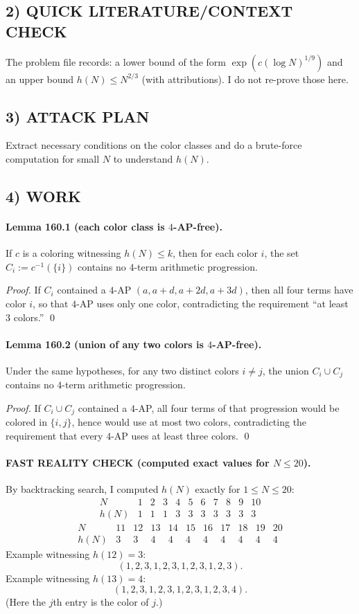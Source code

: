 \subsection*{2) QUICK LITERATURE/CONTEXT CHECK}
The problem file records: a lower bound of the form $\exp(c(\log N)^{1/9})$ and an upper bound $h(N)\le N^{2/3}$ (with attributions). I do not re-prove those here.

\subsection*{3) ATTACK PLAN}
Extract necessary conditions on the color classes and do a brute-force computation for small $N$ to understand $h(N)$.

\subsection*{4) WORK}
\paragraph{Lemma 160.1 (each color class is $4$-AP-free).}
If $c$ is a coloring witnessing $h(N)\le k$, then for each color $i$, the set $C_i:=c^{-1}(\{i\})$ contains no $4$-term arithmetic progression.

\textit{Proof.}
If $C_i$ contained a $4$-AP $(a,a+d,a+2d,a+3d)$, then all four terms have color $i$, so that $4$-AP uses only one color, contradicting the requirement ``at least $3$ colors.'' \qed

\paragraph{Lemma 160.2 (union of any two colors is $4$-AP-free).}
Under the same hypotheses, for any two distinct colors $i\ne j$, the union $C_i\cup C_j$ contains no $4$-term arithmetic progression.

\textit{Proof.}
If $C_i\cup C_j$ contained a $4$-AP, all four terms of that progression would be colored in $\{i,j\}$, hence would use at most two colors, contradicting the requirement that every $4$-AP uses at least three colors. \qed

\paragraph{FAST REALITY CHECK (computed exact values for $N\le 20$).}
By backtracking search, I computed $h(N)$ exactly for $1\le N\le 20$:
\[
\begin{array}{c|cccccccccc}
N&1&2&3&4&5&6&7&8&9&10\\\hline
h(N)&1&1&1&3&3&3&3&3&3&3
\end{array}
\]
\[
\begin{array}{c|cccccccccc}
N&11&12&13&14&15&16&17&18&19&20\\\hline
h(N)&3&3&4&4&4&4&4&4&4&4
\end{array}
\]
Example witnessing $h(12)=3$:
\[
(1,2,3,1,2,3,1,2,3,1,2,3).
\]
Example witnessing $h(13)=4$:
\[
(1,2,3,1,2,3,1,2,3,1,2,3,4).
\]
(Here the $j$th entry is the color of $j$.)

